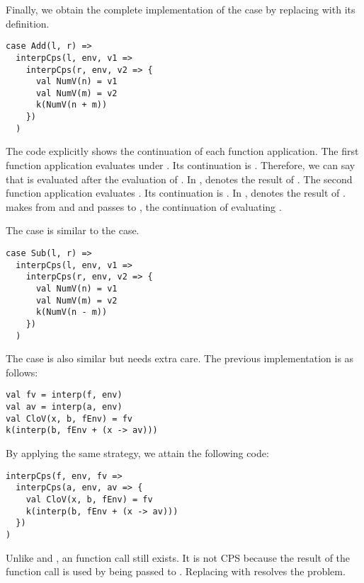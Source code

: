 Finally, we obtain the complete implementation of the  case by
replacing  with its definition.

\begin{verbatim}
case Add(l, r) =>
  interpCps(l, env, v1 =>
    interpCps(r, env, v2 => {
      val NumV(n) = v1
      val NumV(m) = v2
      k(NumV(n + m))
    })
  )
\end{verbatim}

The code explicitly shows the continuation of each function application.
The first function application evaluates  under . Its
continuation is .
Therefore, we can say that  is evaluated after the evaluation of
. In ,
 denotes the result of . The second function application
evaluates . Its continuation
is . In , 
denotes the result of .  makes 
from  and  and passes  to , the
continuation of evaluating .

The  case is similar to the  case.

\begin{verbatim}
case Sub(l, r) =>
  interpCps(l, env, v1 =>
    interpCps(r, env, v2 => {
      val NumV(n) = v1
      val NumV(m) = v2
      k(NumV(n - m))
    })
  )
\end{verbatim}

The  case is also similar but needs extra care.
The previous implementation is as follows:

\begin{verbatim}
val fv = interp(f, env)
val av = interp(a, env)
val CloV(x, b, fEnv) = fv
k(interp(b, fEnv + (x -> av)))
\end{verbatim}

By applying the same strategy, we attain the following code:

\begin{verbatim}
interpCps(f, env, fv =>
  interpCps(a, env, av => {
    val CloV(x, b, fEnv) = fv
    k(interp(b, fEnv + (x -> av)))
  })
)
\end{verbatim}

Unlike  and , an  function call still exists.
It is not CPS because the result of the function call is used by being passed to
. Replacing  with  resolves the problem.

